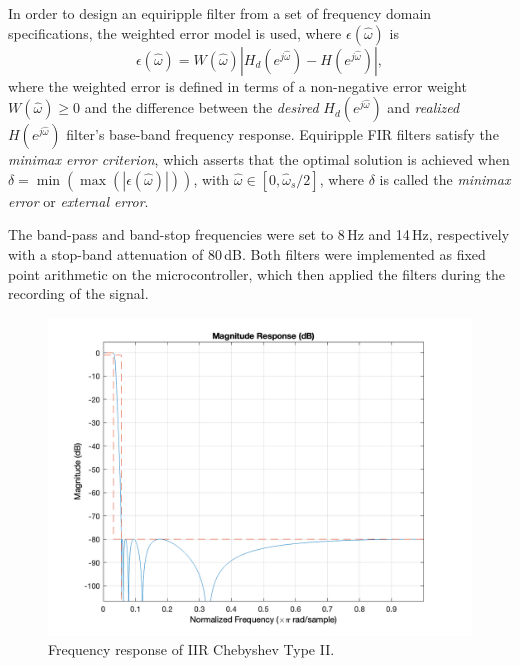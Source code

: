 In order to design an equiripple filter from a set of frequency domain specifications, the weighted error model is used, where $\epsilon(\hat{\omega})$ is 
\begin{equation}
	\epsilon(\hat{\omega}) = W(\hat{\omega}) |H_d(e^{j\hat{\omega}}) - H(e^{j\hat{\omega}})|,
\end{equation}
where the weighted error is defined in terms of a non-negative error weight $W(\hat{\omega}) \ge 0$ and the difference between the \emph{desired} $H_d(e^{j\hat{\omega}})$ and \emph{realized} $ H(e^{j\hat{\omega}})$ filter's base-band frequency response. 
Equiripple FIR filters satisfy the \emph{minimax error criterion}, which asserts that the optimal solution is achieved when $\delta = \min(\max(|\epsilon(\hat{\omega})|))$, with $\hat{\omega} \in [0, \hat{\omega}_s/2]$, where $\delta$ is called the \emph{minimax error} or \emph{external error}.  \cite{williams_electronic_2006}

The band-pass and band-stop frequencies were set to 8\,Hz and 14\,Hz, respectively with a stop-band attenuation of 80\,dB. Both filters were implemented as fixed point arithmetic on the microcontroller, which then applied the filters during the recording of the signal.

\begin{figure}[H]
	\centering
	\includegraphics[width=\linewidth, trim={2.5cm, 1cm, 4cm, 1cm}, clip]{Figures/chebyII.png}
	\caption{Frequency response of IIR Chebyshev Type II.}
	\label{fig:cheby}
\end{figure}

